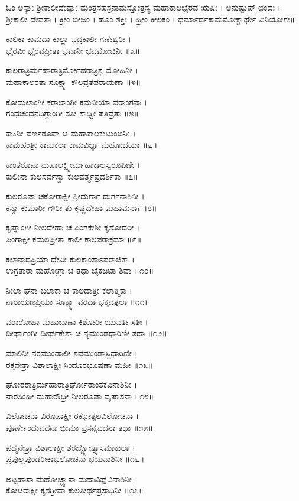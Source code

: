 ಓಂ ಅಸ್ಯಾಃ ಶ್ರೀಕಾಲೀದೇವ್ಯಾಃ ಮಂತ್ರಸಹಸ್ರನಾಮಸ್ತೋತ್ರಸ್ಯ ಮಹಾಕಾಲಭೈರವ ಋಷಿಃ । ಅನುಷ್ಟುಪ್ ಛಂದಃ । ಶ್ರೀಕಾಲೀ ದೇವತಾ । ಕ್ರೀಂ ಬೀಜಂ । ಹೂಂ ಶಕ್ತಿಃ । ಹ್ರೀಂ ಕೀಲಕಂ । ಧರ್ಮಾರ್ಥಕಾಮಮೋಕ್ಷಾರ್ಥೇ ವಿನಿಯೋಗಃ॥

ಕಾಲಿಕಾ ಕಾಮದಾ ಕುಲ್ಲಾ ಭದ್ರಕಾಲೀ ಗಣೇಶ್ವರೀ ।\\
ಭೈರವೀ ಭೈರವಪ್ರೀತಾ ಭವಾನೀ ಭವಮೋಚಿನೀ ॥೩॥

ಕಾಲರಾತ್ರಿರ್ಮಹಾರಾತ್ರಿರ್ಮೋಹರಾತ್ರಿಶ್ಚ ಮೋಹಿನೀ ।\\
ಮಹಾಕಾಲರತಾ ಸೂಕ್ಷ್ಮಾ ಕೌಲವ್ರತಪರಾಯಣಾ ॥೪॥

ಕೋಮಲಾಂಗೀ ಕರಾಲಾಂಗೀ ಕಮನೀಯಾ ವರಾಂಗನಾ ।\\
ಗಂಧಚಂದನದಿಗ್ಧಾಂಗೀ ಸತೀ ಸಾಧ್ವೀ ಪತಿವ್ರತಾ ॥೫॥

ಕಾಕಿನೀ ವರ್ಣರೂಪಾ ಚ ಮಹಾಕಾಲಕುಟುಂಬಿನೀ ।\\
ಕಾಮಹಂತ್ರೀ ಕಾಮಕಲಾ ಕಾಮವಿಜ್ಞಾ ಮಹೋದಯಾ ॥೬॥

ಕಾಂತರೂಪಾ ಮಹಾಲಕ್ಷ್ಮೀರ್ಮಹಾಕಾಲಸ್ವರೂಪಿಣೀ ।\\
ಕುಲೀನಾ ಕುಲಸರ್ವಸ್ವಾ ಕುಲವರ್ತ್ಮಪ್ರದರ್ಶಿಕಾ ॥೭॥

ಕುಲರೂಪಾ ಚಕೋರಾಕ್ಷೀ ಶ್ರೀದುರ್ಗಾ ದುರ್ಗನಾಶಿನೀ ।\\
ಕನ್ಯಾ ಕುಮಾರೀ ಗೌರೀ ತು ಕೃಷ್ಣದೇಹಾ ಮಹಾಮನಾಃ ॥೮॥

ಕೃಷ್ಣಾಂಗೀ ನೀಲದೇಹಾ ಚ ಪಿಂಗಕೇಶೀ ಕೃಶೋದರೀ ।\\
ಪಿಂಗಾಕ್ಷೀ ಕಮಲಪ್ರೀತಾ ಕಾಲೀ ಕಾಲಪರಾಕ್ರಮಾ ॥೯॥

ಕಲಾನಾಥಪ್ರಿಯಾ ದೇವೀ ಕುಲಕಾಂತಾಽಪರಾಜಿತಾ ।\\
ಉಗ್ರತಾರಾ ಮಹೋಗ್ರಾ ಚ ತಥಾ ಚೈಕಜಟಾ ಶಿವಾ ॥೧೦॥

ನೀಲಾ ಘನಾ ಬಲಾಕಾ ಚ ಕಾಲದಾತ್ರೀ ಕಲಾತ್ಮಿಕಾ ।\\
ನಾರಾಯಣಪ್ರಿಯಾ ಸೂಕ್ಷ್ಮಾ ವರದಾ ಭಕ್ತವತ್ಸಲಾ ॥೧೧॥

ವರಾರೋಹಾ ಮಹಾಬಾಣಾ ಕಿಶೋರೀ ಯುವತೀ ಸತೀ ।\\
ದೀರ್ಘಾಂಗೀ ದೀರ್ಘಕೇಶಾ ಚ ನೃಮುಂಡಧಾರಿಣೀ ತಥಾ ॥೧೨॥

ಮಾಲಿನೀ ನರಮುಂಡಾಲೀ ಶವಮುಂಡಾಸ್ಥಿಧಾರಿಣೀ ।\\
ರಕ್ತನೇತ್ರಾ ವಿಶಾಲಾಕ್ಷೀ ಸಿಂದೂರಭೂಷಣಾ ಮಹೀ ॥೧೩॥

ಘೋರರಾತ್ರಿರ್ಮಹಾರಾತ್ರಿರ್ಘೋರಾಂತಕವಿನಾಶಿನೀ ।\\
ನಾರಸಿಂಹೀ ಮಹಾರೌದ್ರೀ ನೀಲರೂಪಾ ವೃಷಾಸನಾ ॥೧೪॥

ವಿಲೋಚನಾ ವಿರೂಪಾಕ್ಷೀ ರಕ್ತೋತ್ಪಲವಿಲೋಚನಾ ।\\
ಪೂರ್ಣೇಂದುವದನಾ ಭೀಮಾ ಪ್ರಸನ್ನವದನಾ ತಥಾ ॥೧೫॥

ಪದ್ಮನೇತ್ರಾ ವಿಶಾಲಾಕ್ಷೀ ಶರಜ್ಜ್ಯೋತ್ಸ್ನಾಸಮಾಕುಲಾ ।\\
ಪ್ರಫುಲ್ಲಪುಂಡರೀಕಾಭಲೋಚನಾ ಭಯನಾಶಿನೀ ॥೧೬॥

ಅಟ್ಟಹಾಸಾ ಮಹೋಚ್ಛ್ವಾಸಾ ಮಹಾವಿಘ್ನವಿನಾಶಿನೀ ।\\
ಕೋಟರಾಕ್ಷೀ ಕೃಶಗ್ರೀವಾ ಕುಲತೀರ್ಥಪ್ರಸಾಧಿನೀ ॥೧೭॥

